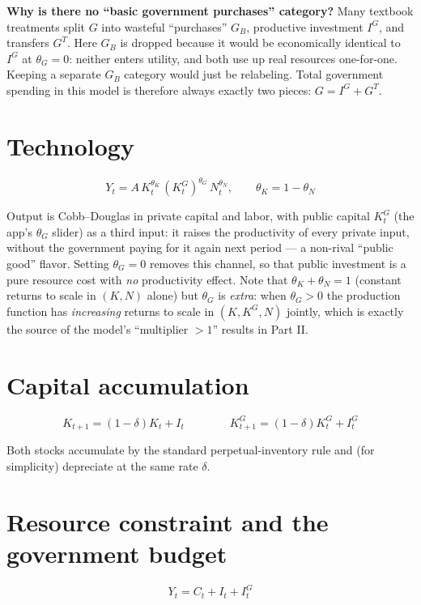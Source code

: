 \documentclass[11pt]{article}
\newcommand{\eq}[1]{\begin{equation}#1\end{equation}}
\begin{document}
\begin{notebox}
\textbf{Why is there no ``basic government purchases'' category?} Many
textbook treatments split $G$ into wasteful ``purchases'' $G_B$, productive
investment $I^G$, and transfers $G^T$. Here $G_B$ is dropped because it
would be economically identical to $I^G$ at $\theta_G=0$: neither enters
utility, and both use up real resources one-for-one. Keeping a separate
$G_B$ category would just be relabeling. Total government spending in this
model is therefore always exactly two pieces: $G = I^G + G^T$.
\end{notebox}

\section{Technology}

\eq{ Y_t = A\,K_t^{\theta_K}\,(K^G_t)^{\theta_G}\,N_t^{\theta_N}, \qquad \theta_K=1-\theta_N }

Output is Cobb--Douglas in private capital and labor, with public capital
$K^G_t$ (the app's $\theta_G$ slider) as a third input: it raises the
productivity of every private input, without the government paying for it
again next period --- a non-rival ``public good'' flavor. Setting
$\theta_G=0$ removes this channel, so that
public investment is a pure resource cost with \emph{no} productivity
effect. Note that $\theta_K+\theta_N=1$ (constant returns to scale in
$(K,N)$ alone) but $\theta_G$ is \emph{extra}: when $\theta_G>0$ the
production function has \emph{increasing} returns to scale in
$(K,K^G,N)$ jointly, which is exactly the source of the model's
``multiplier $>1$'' results in Part II.

\section{Capital accumulation}

\eq{ K_{t+1} = (1-\delta)K_t + I_t \qquad\qquad K^G_{t+1} = (1-\delta)K^G_t + I^G_t }

Both stocks accumulate by the standard perpetual-inventory rule and (for
simplicity) depreciate at the same rate $\delta$.

\section{Resource constraint and the government budget}

\eq{ Y_t = C_t + I_t + I^G_t }
\end{document}
